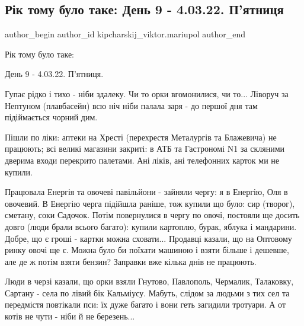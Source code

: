  
 
 
 
 

\subsection{Рік тому  було таке:  День 9 - 4.03.22. П'ятниця}
\label{sec:04_03_2023.fb.kipcharskij_viktor.mariupol.1.r_k_tomu__bulo_take_}

\ifcmt
 author_begin
   author_id kipcharskij_viktor.mariupol
 author_end
\fi

Рік тому  було таке: 

День 9 - 4.03.22. П'ятниця. 

Гупає рідко і тихо - ніби здалеку. Чи то орки вгомонилися, чи то... Ліворуч за
Нептуном (плавбасейн) всю ніч ніби палала заря - до першої дня там підіймається
чорний дим.

Пішли по ліки: аптеки на Хресті (перехрестя Металургів та Блажевича) не
працюють; всі великі магазини закриті: в АТБ та Гастрономі N1 за скляними
дверима входи перекрито палетами. Ані ліків, ані телефонних карток ми не
купили.

Працювала Енергія та овочеві павільйони - зайняли чергу: я в Енергію, Оля в
овочевий. В Енергію черга підійшла раніше, тож купили що було: сир (творог),
сметану, соки Садочок. Потім повернулися в чергу по овочі, постояли ще досить
довго (люди брали всього багато): купили картоплю, бурак, яблука і мандарини.
Добре, що є гроші - картки можна сховати... Продавці казали, що на Оптовому
ринку овочі ще є. Можна було би поїхати машиною і взяти більше і дешевше, але
де ж потім взяти бензин? Заправки вже кілька днів не працюють. 

Люди в черзі казали, що орки взяли  Гнутово, Павлополь, Чермалик, Талаковку,
Сартану - села по лівий бік Кальміусу. Мабуть, слідом за людьми з тих сел та
передмістя повтікали пси: їх дуже багато і вони геть загидили тротуари. А от
котів не чути - ніби й не березень...

